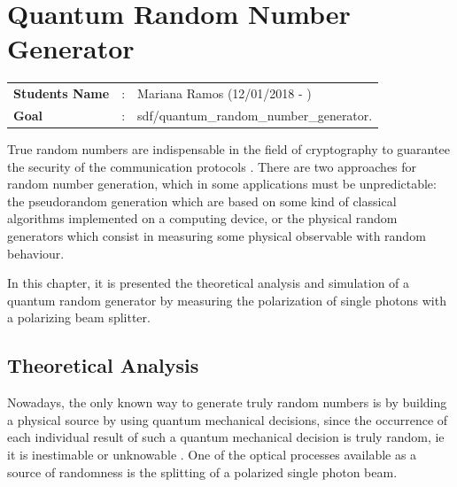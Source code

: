 \clearpage
\section{Quantum Random Number Generator}

\begin{tcolorbox}	
\begin{tabular}{p{2.75cm} p{0.2cm} p{10.5cm}} 	
\textbf{Students Name}  &:& Mariana Ramos (12/01/2018 - )\\
\textbf{Goal}          &:& sdf/quantum\_random\_number\_generator.
\end{tabular}
\end{tcolorbox}

True random numbers are indispensable in the field of cryptography to guarantee the security of the communication protocols \cite{katsoprinakis2008quantum}. There are two approaches for random number generation, which in some applications must be unpredictable: the pseudorandom generation which are based on some kind of classical algorithms implemented on a computing device, or the physical random generators which consist in measuring some physical observable with random behaviour.

In this chapter, it is presented the theoretical analysis and simulation of a quantum random generator by measuring the polarization of single photons with a polarizing beam splitter.

\subsection{Theoretical Analysis}

Nowadays, the only known way to generate truly random numbers is by building a physical source by using quantum mechanical decisions, since the occurrence of each individual result of such a quantum mechanical decision is truly random, ie it is inestimable or unknowable \cite{Zeilinger}. One of the optical processes available as a source of randomness is the splitting of a polarized single photon beam.

